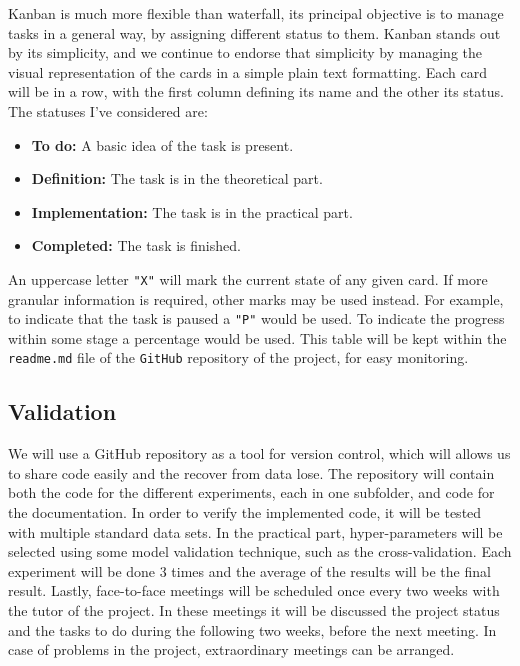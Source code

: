 Kanban is much more flexible than waterfall, its principal objective is to manage tasks in a general way, by assigning different status to them. Kanban stands out by its simplicity, and we continue to endorse that simplicity by managing the visual representation of the cards in a simple plain text formatting. Each card will be in a row, with the first column defining its name and the other its status. The statuses I've considered are:

\begin{itemize}
    \item \textbf{To do:} A basic idea of the task is present.
    \item \textbf{Definition:} The task is in the theoretical part.
    \item \textbf{Implementation:} The task is in the practical part.
    \item \textbf{Completed:} The task is finished.
\end{itemize}

An uppercase letter \texttt{"X"} will mark the current state of any given card. If more granular information is required, other marks may be used instead. For example, to indicate that the task is paused a \texttt{"P"} would be used. To indicate the progress within some stage a percentage would be used. This table will be kept within the \texttt{readme.md} file of the \texttt{GitHub} repository of the project, for easy monitoring.

\subsection{Validation}

We will use a GitHub repository as a tool for version control, which will allows us to share code easily and the recover from data lose. The repository will contain both the code for the different experiments, each in one subfolder, and code for the documentation. In order to verify the implemented code, it will be tested with multiple standard data sets. In the practical part, hyper-parameters will be selected using some model validation technique, such as the cross-validation. Each experiment will be done 3 times and the average of the results will be the final result. Lastly, face-to-face meetings will be scheduled once every two weeks with the tutor of the project. In these meetings it will be discussed the project status and the tasks to do during the following two weeks, before the next meeting. In case of problems in the project, extraordinary meetings can be arranged.
